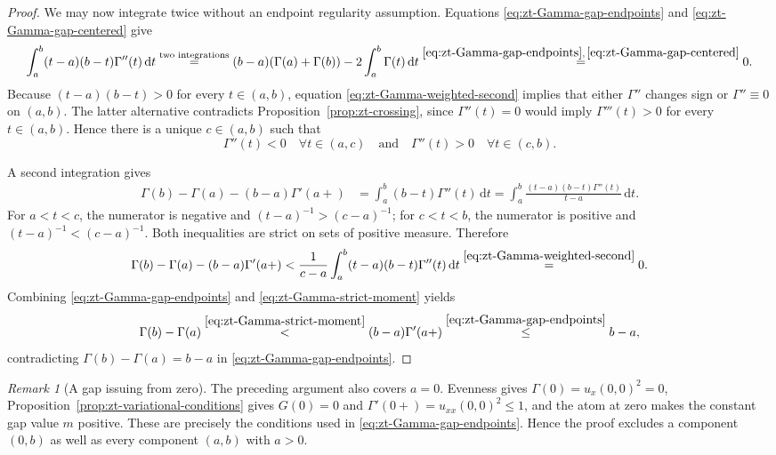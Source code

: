 \documentclass[10pt]{amsart}
\theoremstyle{definition}
\theoremstyle{remark}
\newtheorem{remark}[remark]{Remark}
\numberwithin{equation}{section}
\newcommand{\1}{\mathbf 1}
\newcommand{\dd}{\,\mathrm d}
\newcommand{\stackref}[2]{\stackrel{#2}{#1}}
\begin{document}
\begin{proof}
We may now integrate twice without an endpoint regularity assumption. Equations \eqref{eq:zt-Gamma-gap-endpoints} and \eqref{eq:zt-Gamma-gap-centered} give
\begin{equation}
 \int_a^b(t-a)(b-t)\Gamma''(t)\dd t
 \stackref{=}{\text{two integrations}}
 (b-a)(\Gamma(a)+\Gamma(b))-2\int_a^b\Gamma(t)\dd t
 \stackref{=}{\eqref{eq:zt-Gamma-gap-endpoints},\,\eqref{eq:zt-Gamma-gap-centered}}0.
 \label{eq:zt-Gamma-weighted-second}
\end{equation}
Because $(t-a)(b-t)>0$ for every $t\in(a,b)$, equation \eqref{eq:zt-Gamma-weighted-second} implies that either $\Gamma''$ changes sign or $\Gamma''\equiv0$ on $(a,b)$. The latter alternative contradicts Proposition~\ref{prop:zt-crossing}, since $\Gamma''(t)=0$ would imply $\Gamma'''(t)>0$ for every $t\in(a,b)$. Hence there is a unique $c\in(a,b)$ such that
\begin{equation*}
 \Gamma''(t)<0\quad\forall t\in(a,c)
 \quad\text{and}\quad
 \Gamma''(t)>0\quad\forall t\in(c,b).
\end{equation*}

A second integration gives
\begin{align*}
 \Gamma(b)-\Gamma(a)-(b-a)\Gamma'(a+)
 &=\int_a^b(b-t)\Gamma''(t)\dd t =\int_a^b\frac{(t-a)(b-t)\Gamma''(t)}{t-a}\dd t.
\end{align*}
For $a<t<c$, the numerator is negative and $(t-a)^{-1}>(c-a)^{-1}$; for $c<t<b$, the numerator is positive and $(t-a)^{-1}<(c-a)^{-1}$. Both inequalities are strict on sets of positive measure. Therefore
\begin{equation}
 \Gamma(b)-\Gamma(a)-(b-a)\Gamma'(a+)
 <\frac1{c-a}\int_a^b(t-a)(b-t)\Gamma''(t)\dd t
 \stackref{=}{\eqref{eq:zt-Gamma-weighted-second}}0.
 \label{eq:zt-Gamma-strict-moment}
\end{equation}
Combining \eqref{eq:zt-Gamma-gap-endpoints} and \eqref{eq:zt-Gamma-strict-moment} yields
\begin{equation*}
 \Gamma(b)-\Gamma(a)
 \stackref{<}{\eqref{eq:zt-Gamma-strict-moment}}
 (b-a)\Gamma'(a+)
 \stackref{\leq}{\eqref{eq:zt-Gamma-gap-endpoints}}b-a,
\end{equation*}
contradicting $\Gamma(b)-\Gamma(a)=b-a$ in \eqref{eq:zt-Gamma-gap-endpoints}.
\end{proof}

\begin{remark}[A gap issuing from zero]
\label{rem:zt-first-gap}
The preceding argument also covers $a=0$. Evenness gives $\Gamma(0)=u_x(0,0)^2=0$, Proposition~\ref{prop:zt-variational-conditions} gives $G(0)=0$ and $\Gamma'(0+)=u_{xx}(0,0)^2\leq1$, and the atom at zero makes the constant gap value $m$ positive. These are precisely the conditions used in \eqref{eq:zt-Gamma-gap-endpoints}. Hence the proof excludes a component $(0,b)$ as well as every component $(a,b)$ with $a>0$.
\end{remark}
\end{document}

